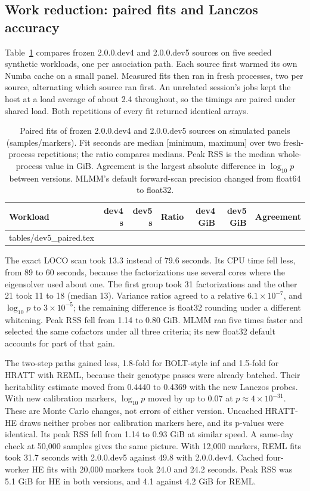 \documentclass[11pt]{article}
\makeatletter
\newcommand{\tabinput}[1]{\@@input #1 }
\makeatother
\begin{document}
\subsection{Work reduction: paired fits and Lanczos accuracy}
\label{sec:dev5-results}

Table~\ref{tab:dev5-paired} compares frozen 2.0.0.dev4 and 2.0.0.dev5
sources on five seeded synthetic workloads, one per association path. Each
source first warmed its own Numba cache on a small panel. Measured fits
then ran in fresh processes, two per source, alternating which source ran
first. An unrelated session's jobs kept the host at a load average of
about 2.4 throughout, so the timings are paired under shared load. Both repetitions of every fit returned
identical arrays.

\begin{table}[htbp]
 \centering\small
 \caption{Paired fits of frozen 2.0.0.dev4 and 2.0.0.dev5 sources on
 simulated panels (samples/markers). Fit seconds are median [minimum,
 maximum] over two fresh-process repetitions; the ratio compares medians.
 Peak RSS is the median whole-process value in GiB. Agreement is the
 largest absolute difference in $\log_{10}p$ between versions. MLMM's
 default forward-scan precision changed from float64 to float32.}
 \label{tab:dev5-paired}
 \begin{tabularx}{\textwidth}{@{}>{\raggedright\arraybackslash}Xrrrrrl@{}}
 \toprule
 Workload & dev4 s & dev5 s & Ratio & dev4 GiB & dev5 GiB & Agreement \\
 \midrule
 \tabinput{tables/dev5_paired.tex}
 \bottomrule
 \end{tabularx}
\end{table}

The exact LOCO scan took 13.3 instead of 79.6 seconds. Its CPU time fell
less, from 89 to 60 seconds, because the factorizations use several cores
where the eigensolver used about one. The first group took 31
factorizations and the other 21 took 11 to 18 (median 13). Variance ratios
agreed to a relative $6.1\times10^{-7}$, and $\log_{10}p$ to
$3\times10^{-5}$; the remaining difference is float32 rounding under a
different whitening. Peak RSS fell from 1.14 to 0.80 GiB. MLMM ran five
times faster and selected the same cofactors under all three criteria;
its new float32 default accounts for part of that gain.

The two-step paths gained less, 1.8-fold for BOLT-style inf and 1.5-fold for
HRATT with REML, because their genotype passes were already batched. Their
heritability estimate moved from 0.4440 to 0.4369 with the new Lanczos
probes. With new calibration markers, $\log_{10}p$ moved by up to 0.07 at
$p\approx4\times10^{-31}$. These are Monte Carlo changes, not errors of
either version. Uncached HRATT-HE draws neither probes nor calibration
markers here, and its p-values were identical. Its peak RSS fell from
1.14 to 0.93 GiB at similar speed. A same-day check at 50,000 samples
gives the same picture. With 12,000 markers, REML fits took 31.7 seconds
with 2.0.0.dev5 against 49.8 with 2.0.0.dev4. Cached four-worker HE fits
with 20,000 markers took 24.0 and 24.2 seconds. Peak RSS was
5.1 GiB for HE in both versions, and 4.1 against 4.2 GiB for REML.
\end{document}

